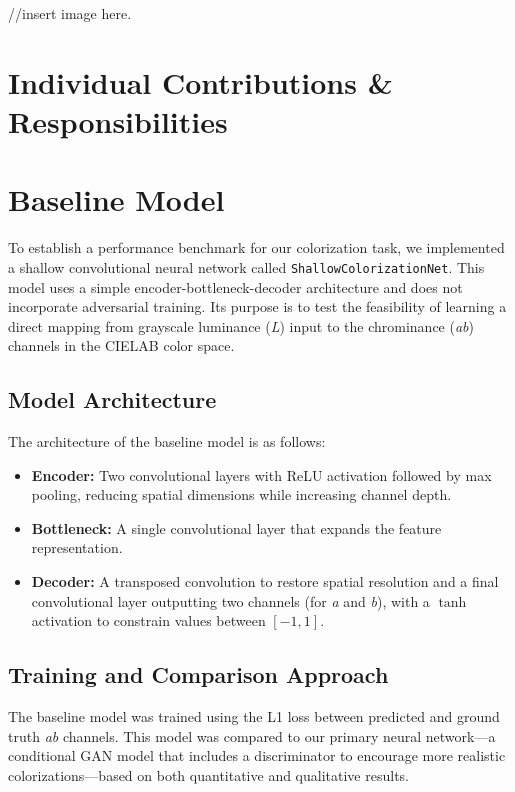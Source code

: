 \documentclass{article} %
\begin{document}
//insert image here. 



\section{Individual Contributions \& Responsibilities}



\section{Baseline Model}

To establish a performance benchmark for our colorization task, we implemented a shallow convolutional neural network called \texttt{ShallowColorizationNet}. This model uses a simple 
encoder-bottleneck-decoder architecture and does not incorporate adversarial training. Its purpose is to test the feasibility of learning a direct mapping from grayscale luminance (\textit{L}) 
input to the chrominance (\textit{ab}) channels in the CIELAB color space.

\subsection{Model Architecture}

The architecture of the baseline model is as follows:
\begin{itemize}
    \item \textbf{Encoder:} Two convolutional layers with ReLU activation followed by max pooling, reducing spatial dimensions while increasing channel depth.
    \item \textbf{Bottleneck:} A single convolutional layer that expands the feature representation.
    \item \textbf{Decoder:} A transposed convolution to restore spatial resolution and a final convolutional layer outputting two channels (for \textit{a} and \textit{b}), with a $\tanh$ 
    activation to constrain values between $[-1, 1]$.
\end{itemize}

\subsection{Training and Comparison Approach}

The baseline model was trained using the L1 loss between predicted and ground truth \textit{ab} channels. This model was compared to our primary neural network—a conditional 
GAN model that includes a discriminator to encourage more realistic colorizations—based on both quantitative and qualitative results.
\end{document}
